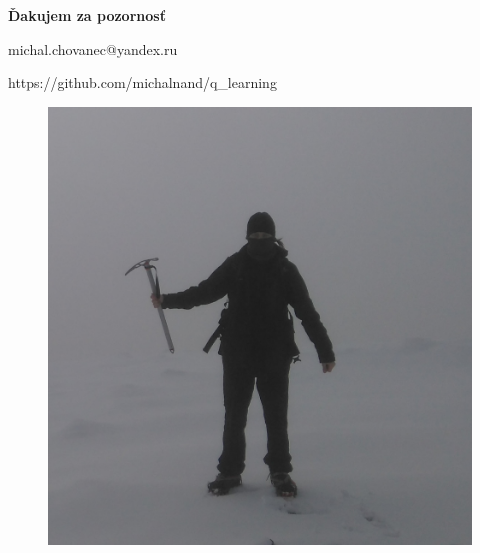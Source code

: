 \documentclass[xcolor=dvipsnames]{beamer}
\begin{document}
\begin{frame}{\bf Ďakujem za pozornosť}

\centerline{michal.chovanec@yandex.ru}
\centerline{https://github.com/michalnand/q\_learning}

\begin{figure}[!htb]
\centering
\includegraphics[scale=.15]{../pictures/me.jpg}
\end{figure}



\end{frame}
\end{document}
